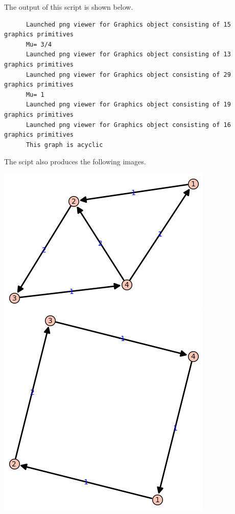 \documentclass[11pt, oneside]{article}
\begin{document}
\begin{enumerate}
    The output of this script is shown below.
    \begin{verbatim}
      Launched png viewer for Graphics object consisting of 15 graphics primitives
      Mu= 3/4
      Launched png viewer for Graphics object consisting of 13 graphics primitives
      Launched png viewer for Graphics object consisting of 29 graphics primitives
      Mu= 1
      Launched png viewer for Graphics object consisting of 19 graphics primitives
      Launched png viewer for Graphics object consisting of 16 graphics primitives
      This graph is acyclic
    \end{verbatim}
    The scipt also produces the following images.
    \begin{center}
      \includegraphics[scale=.5]{Figures/09_1.png}
      \includegraphics[scale=.5]{Figures/09_2.png} \\

\end{center}
\end{enumerate}
\end{document}
